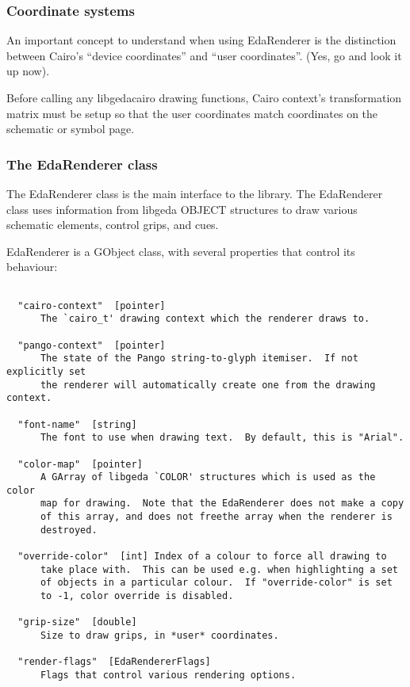 \subsubsection*{Coordinate systems}


  An important concept to understand when using EdaRenderer is the distinction between Cairo's ``device coordinates'' and ``user coordinates''. (Yes, go and look it up now).


  Before calling any libgedacairo drawing functions, Cairo context's transformation matrix must be setup so that the user coordinates match coordinates on the schematic or symbol page.



\subsubsection*{The EdaRenderer class}
 The EdaRenderer class is the main interface to the library. The EdaRenderer class uses information from libgeda OBJECT structures to draw various schematic elements, control grips, and cues.

  EdaRenderer is a GObject class, with several properties that control its behaviour: \begin{verbatim}

  "cairo-context"  [pointer]
      The `cairo_t' drawing context which the renderer draws to.

  "pango-context"  [pointer]
      The state of the Pango string-to-glyph itemiser.  If not explicitly set
      the renderer will automatically create one from the drawing context.

  "font-name"  [string]
      The font to use when drawing text.  By default, this is "Arial".

  "color-map"  [pointer]
      A GArray of libgeda `COLOR' structures which is used as the color
      map for drawing.  Note that the EdaRenderer does not make a copy
      of this array, and does not freethe array when the renderer is
      destroyed.

  "override-color"  [int] Index of a colour to force all drawing to
      take place with.  This can be used e.g. when highlighting a set
      of objects in a particular colour.  If "override-color" is set
      to -1, color override is disabled.

  "grip-size"  [double]
      Size to draw grips, in *user* coordinates.

  "render-flags"  [EdaRendererFlags]
      Flags that control various rendering options.

\end{verbatim}



